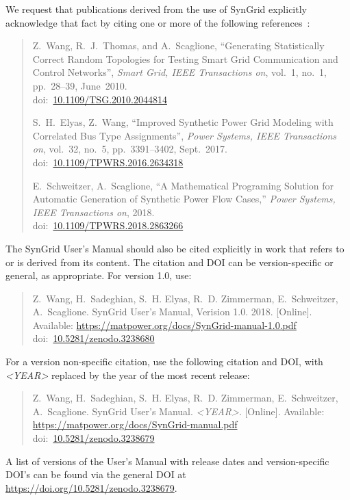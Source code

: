 \documentclass[12pt]{article}
\newcommand{\syngrid}[0]{{SynGrid}}
\newcommand{\doi}[1]{doi:~\href{https://doi.org/#1}{#1}}
\numberwithin{equation}{section}
\numberwithin{table}{section}
\numberwithin{figure}{section}
\begin{document}
We request that publications derived from the use of \syngrid{} explicitly
acknowledge that fact by citing one or more of the following
references~\cite{syngrid_nestedSW, syngrid_bustype, schweitzer2018mathematical}:

\begin{quote}
\footnotesize
Z.~Wang, R.~J.~Thomas, and A.~Scaglione, ``Generating Statistically Correct Random Topologies for Testing Smart Grid Communication and Control Networks'', \emph{Smart Grid, IEEE Transactions on}, vol.~1, no.~1, pp.~28--39, June~2010. \\
\doi{10.1109/TSG.2010.2044814}

S.~H.~Elyas, Z.~Wang, ``Improved Synthetic Power Grid Modeling with Correlated Bus Type Assignments'', \emph{Power Systems, IEEE Transactions on}, vol.~32, no.~5, pp.~3391--3402, Sept.~2017. \\
\doi{10.1109/TPWRS.2016.2634318}

E.~Schweitzer, A.~Scaglione, ``A Mathematical Programing Solution for Automatic Generation of Synthetic Power Flow Cases,''  \emph{Power Systems, IEEE Transactions on}, 2018. \\
\doi{10.1109/TPWRS.2018.2863266}
\end{quote}

The \syngrid{} User's Manual should also be cited explicitly in work that
refers to or is derived from its content. The citation and DOI can be
version-specific or general, as appropriate. For version 1.0, use:

\begin{quote}
\footnotesize
Z.~Wang, H.~Sadeghian, S.~H. Elyas, R.~D. Zimmerman, E.~Schweitzer,
A.~Scaglione. \syngrid{} User's Manual, Verision 1.0. 2018. [Online]. Available: \url{https://matpower.org/docs/SynGrid-manual-1.0.pdf}\\
\doi{10.5281/zenodo.3238680}
\end{quote}
For a version non-specific citation, use the following citation and DOI,
with \emph{\textless{}YEAR\textgreater{}} replaced by the year of the most recent release:

\begin{quote}
\footnotesize
Z.~Wang, H.~Sadeghian, S.~H. Elyas, R.~D. Zimmerman, E.~Schweitzer,
A.~Scaglione. \syngrid{} User's Manual. \emph{\textless{}YEAR\textgreater{}}.
[Online]. Available: \url{https://matpower.org/docs/SynGrid-manual.pdf}\\
\doi{10.5281/zenodo.3238679}
\end{quote}
A list of versions of the User's Manual with release dates and
version-specific DOI's can be found via the general DOI at
\url{https://doi.org/10.5281/zenodo.3238679}.
\end{document}
